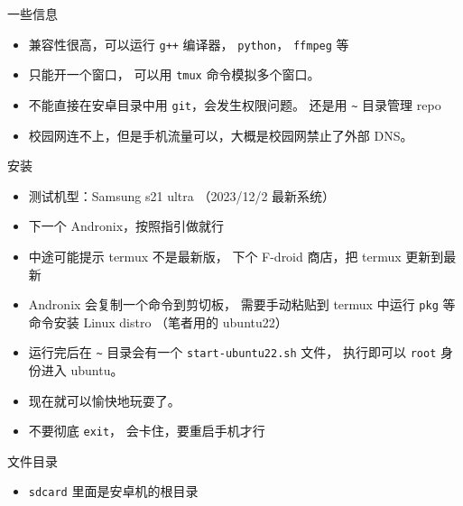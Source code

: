 
一些信息
\begin{itemize}
\item 兼容性很高，可以运行 \verb`g++` 编译器， \verb`python`， \verb`ffmpeg` 等
\item 只能开一个窗口， 可以用 \verb`tmux` 命令模拟多个窗口。
\item 不能直接在安卓目录中用 \verb`git`，会发生权限问题。 还是用 \verb`~` 目录管理 repo
\item 校园网连不上，但是手机流量可以，大概是校园网禁止了外部 DNS。
\end{itemize}

安装
\begin{itemize}
\item 测试机型：Samsung s21 ultra （2023/12/2 最新系统）
\item 下一个 Andronix，按照指引做就行
\item 中途可能提示 termux 不是最新版， 下个 F-droid 商店，把 termux 更新到最新
\item Andronix 会复制一个命令到剪切板， 需要手动粘贴到 termux 中运行 \verb`pkg` 等命令安装 Linux distro （笔者用的 ubuntu22）
\item 运行完后在 \verb`~` 目录会有一个 \verb`start-ubuntu22.sh` 文件， 执行即可以 \verb`root` 身份进入 ubuntu。
\item 现在就可以愉快地玩耍了。
\item 不要彻底 \verb`exit`， 会卡住，要重启手机才行
\end{itemize}


文件目录
\begin{itemize}
\item \verb`sdcard` 里面是安卓机的根目录
\end{itemize}

